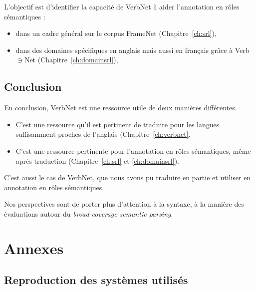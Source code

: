 \documentclass[oneside,parskip,draft]{scrbook}
\newcommand{\verbenet}{Verb$\ni$Net}
\begin{document}
L'objectif est d'identifier la capacité de VerbNet à aider l'annotation en
rôles sémantiques :
\begin{itemize}
    \item dans un cadre général sur le corpus FrameNet (Chapitre~\ref{ch:srl}),
    \item dans des domaines spécifiques en anglais mais aussi en français grâce
        à \verbenet{} (Chapitre~\ref{ch:domainsrl}),
\end{itemize}





\chapter*{Conclusion}
\label{ch:conc}

En conclusion, VerbNet est une ressource utile de deux manières différentes.
\begin{itemize}
    \item C'est une ressource qu'il est pertinent de traduire pour les langues
        suffisamment proches de l'anglais (Chapitre~\ref{ch:verbnet}.
    \item C'est une ressource pertinente pour l'annotation en rôles
        sémantiques, même après traduction (Chapitre~\ref{ch:srl} et
        \ref{ch:domainsrl}).
\end{itemize}

C'est aussi le cas de VerbNet, que nous avons pu traduire en partie et utiliser
en annotation en rôles sémantiques.

Nos perspectives sont de porter plus d'attention à la syntaxe, à la manière des
évaluations autour du \textit{broad-coverage semantic parsing}.


\backmatter




\part{Annexes}

\chapter{Reproduction des systèmes utilisés}
\end{document}
